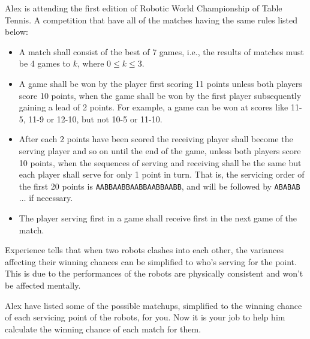 Alex is attending the first edition of Robotic World Championship of Table 
Tennis. 
A competition that have all of the matches having the same rules listed below:

\begin{itemize}
\tightlist
\item A match shall consist of the best of 7 games,
      i.e., the results of matches must be 4 games to $k$, 
      where $0 \leq k \leq 3$.
\item A game shall be won by the player first scoring 11 points unless both 
      players score 10 points, when the game shall be won by the first player 
      subsequently gaining a lead of 2 points.
      For example, a game can be won at scores like 11-5, 11-9 or 12-10, 
      but not 10-5 or 11-10.
\item After each 2 points have been scored the receiving player shall become 
      the serving player and so on until the end of the game, unless both 
      players score 10 points, when the sequences of serving and receiving 
      shall be the same but each player shall serve for only 1 point in turn. 
      That is, the servicing order of the first 20 points is 
      \verb+AABBAABBAABBAABBAABB+, and will be followed by \verb+ABABAB+$\ldots$
      if necessary.
\item The player serving first in a game shall receive first in the next game 
      of the match.
\end{itemize}

Experience tells that when two robots clashes into each other, 
the variances affecting their winning chances can be simplified to 
who's serving for the point. This is due to the performances of the 
robots are physically consistent and won't be affected mentally.

Alex have listed some of the possible matchups, simplified to the winning 
chance of each servicing point of the robots, for you. Now it is your job to 
help him calculate the winning chance of each match for them.
